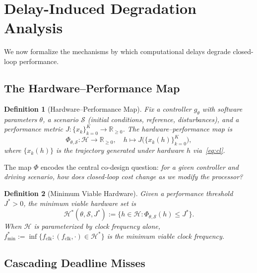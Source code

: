\documentclass[conference]{IEEEtran}
\newcommand{\R}{\mathbb{R}}
\newcommand{\calS}{\mathcal{S}}
\newcommand{\calH}{\mathcal{H}}
\newtheorem{definition}{Definition}
\begin{document}
\section{Delay-Induced Degradation Analysis}\label{sec:analysis}

We now formalize the mechanisms by which computational delays degrade
closed-loop performance.

\subsection{The Hardware--Performance Map}

\begin{definition}[Hardware--Performance Map]\label{def:hp_map}
  Fix a controller $g_\theta$ with software parameters $\theta$,
  a scenario $\calS$ (initial conditions, reference, disturbances),
  and a performance metric $J : \{x_k\}_{k=0}^K \to \R_{\geq 0}$.
  The \emph{hardware--performance map} is
  \begin{equation}\label{eq:hp_map}
    \Phi_{\theta, \calS} : \calH \to \R_{\geq 0},
    \quad h \mapsto J\!\bigl(\{x_k(h)\}_{k=0}^K\bigr),
  \end{equation}
  where $\{x_k(h)\}$ is the trajectory generated under hardware $h$
  via~\eqref{eq:cl}.
\end{definition}

The map $\Phi$ encodes the central co-design question: \emph{for a
given controller and driving scenario, how does closed-loop cost change
as we modify the processor?}

\begin{definition}[Minimum Viable Hardware]\label{def:mvh}
  Given a performance threshold $J^* > 0$, the
  \emph{minimum viable hardware set} is
  \begin{equation}\label{eq:mvh}
    \calH^*(\theta, \calS, J^*) :=
    \bigl\{h \in \calH : \Phi_{\theta, \calS}(h) \leq J^*\bigr\}.
  \end{equation}
  When $\calH$ is parameterized by clock frequency alone,
  $f_{\min}^* := \inf\{f_\text{clk}: (f_\text{clk}, \cdot) \in
  \calH^*\}$ is the \emph{minimum viable clock frequency}.
\end{definition}

\subsection{Cascading Deadline Misses}
\end{document}
